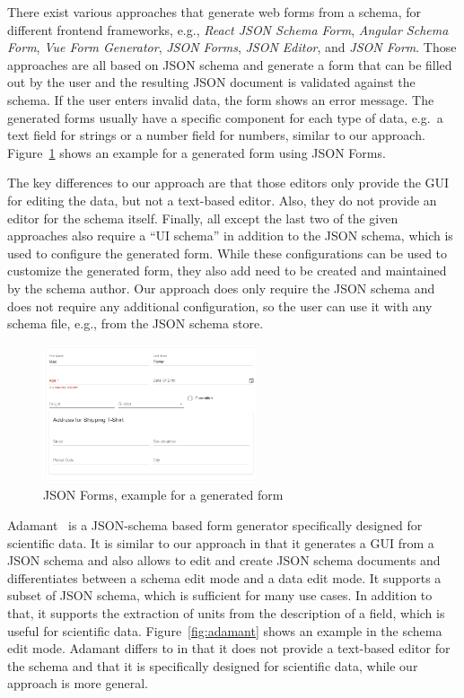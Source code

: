 There exist various approaches that generate web forms from a schema, for different frontend frameworks, e.g.,
\textit{React JSON Schema Form}\cite{githubGitHubRjsfteamreactjsonschemaform},
\textit{Angular Schema Form}\cite{githubGitHubJsonschemaformangularschemaform},
\textit{Vue Form Generator}\cite{githubGitHubVuegeneratorsvueformgenerator},
\textit{JSON Forms}\cite{jsonformsMoreForms},
\textit{JSON Editor}\cite{githubGitHubJosdejongjsoneditor}, and
\textit{JSON Form}\cite{githubGitHubJsonformjsonform}.
Those approaches are all based on JSON schema and generate a form that can be filled out by the user and
the resulting JSON document is validated against the schema.
If the user enters invalid data, the form shows an error message.
The generated forms usually have a specific component for each type of data, e.g.\ a text field for strings or a number field for numbers,
similar to our approach.
Figure~\ref{fig:jsonforms} shows an example for a generated form using JSON Forms.

The key differences to our approach are that those editors only provide the GUI for editing the data, but not a text-based editor.
Also, they do not provide an editor for the schema itself.
Finally, all except the last two of the given approaches also require a ``UI schema'' in addition to the JSON schema, which is used to configure the generated form.
While these configurations can be used to customize the generated form, they also add need to be created and maintained by the schema author.
Our approach does only require the JSON schema and does not require any additional configuration, so the user can
use it with any schema file, e.g., from the JSON schema store.

\begin{figure}[htb]
    \centering
    \includegraphics[width=2.5in]{figures/jsonforms}
    \caption{JSON Forms, example for a generated form}
    \label{fig:jsonforms}
\end{figure}

Adamant~\cite{siffa2022adamant} is a JSON-schema based form generator specifically designed for scientific data.
It is similar to our approach in that it generates a GUI from a JSON schema and also allows to edit and create JSON schema documents
and differentiates between a schema edit mode and a data edit mode.
It supports a subset of JSON schema, which is sufficient for many use cases.
In addition to that, it supports the extraction of units from the description of a field, which is useful for scientific data.
Figure~\ref{fig:adamant} shows an example in the schema edit mode.
Adamant differs to \toolname{} in that it does not provide a text-based editor for the schema and that it is specifically designed for scientific data,
while our approach is more general.

